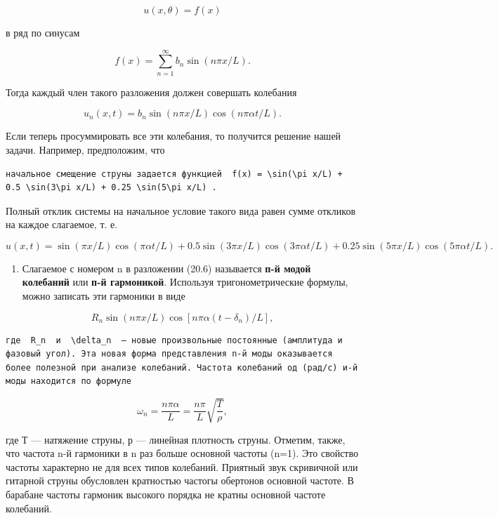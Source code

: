 \documentclass[
  ukrainian,
]{article}
\providecommand{\tightlist}{%
  \setlength{\itemsep}{0pt}\setlength{\parskip}{0pt}}
\begin{document}
\[
u(x, \theta) = f(x)
\]

в ряд по синусам

\[
f(x) = \sum_{n=1}^{\infty} b_n \sin(n\pi x/L).
\]

Тогда каждый член такого разложения должен совершать колебания

\[
u_n(x, t) = b_n \sin(n\pi x/L) \cos(n\pi\alpha t/L).
\]

Если теперь просуммировать все эти колебания, то получится решение нашей
задачи. Например, предположим, что

\begin{verbatim}
начальное смещение струны задается функцией  f(x) = \sin(\pi x/L) + 0.5 \sin(3\pi x/L) + 0.25 \sin(5\pi x/L) .
\end{verbatim}

Полный отклик системы на начальное условие такого вида равен сумме
откликов на каждое слагаемое, т. е.

\[
u(x, t) = \sin(\pi x/L)\cos(\pi \alpha t/L) + 0.5\sin(3\pi x/L)\cos(3\pi \alpha t/L) + 0.25\sin(5\pi x/L)\cos(5\pi \alpha t/L).
\]

\begin{enumerate}
\def\labelenumi{\arabic{enumi}.}
\setcounter{enumi}{1}
\tightlist
\item
  Слагаемое с номером n в разложении (20.6) называется \textbf{п-й модой
  колебаний} или \textbf{п-й гармоникой}. Используя тригонометрические
  формулы, можно записать эти гармоники в виде
\end{enumerate}

\[
R_n \sin(n\pi x/L) \cos[n\pi\alpha(t-\delta_n)/L],
\]

\begin{verbatim}
где  R_n  и  \delta_n  — новые произвольные постоянные (амплитуда и фазовый угол). Эта новая форма представления n-й моды оказывается более полезной при анализе колебаний. Частота колебаний од (рад/с) и-й моды находится по формуле
\end{verbatim}

\[
\omega_n = \frac{n\pi\alpha}{L} = \frac{n\pi}{L} \sqrt{\frac{T}{\rho}},
\]

где Т --- натяжение струны, р --- линейная плотность струны. Отметим,
также, что частота n-й гармоники в n раз больше основной частоты (n=1).
Это свойство частоты характерно не для всех типов колебаний. Приятный
звук скривичной или гитарной струны обусловлен кратностью частогы
обертонов основной частоте. В барабане частоты гармоник высокого порядка
не кратны основной частоте колебаний.
\end{document}
